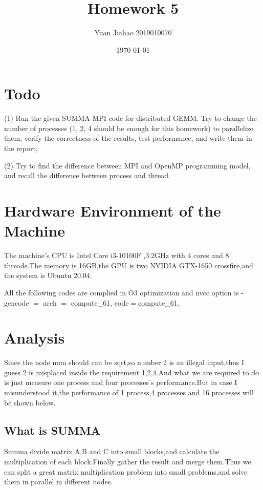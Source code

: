 \documentclass[12pt]{scrartcl} %
\title{	
	Homework 5
}
\author{Yuan Jiahao 2019010070} %
\date{\normalsize\today} %
\begin{document}
\maketitle %


\section{Todo}
 (1) Run the given SUMMA MPI code for distributed GEMM. Try to change the number of
processes (1, 2, 4 should be enough for this homework) to parallelize them, verify the correctness
of the results, test performance, and write them in the report;

(2) Try to find the difference between MPI and OpenMP programming model, and recall
the difference between process and thread.
\section{Hardware Environment of the Machine }
The machine's CPU is Intel Core i3-10100F ,3.2GHz with 4 cores and 8 threads.The memory is 16GB,the GPU is two NVIDIA GTX-1650 crossfire,and the system is Ubuntu 20.04.

All the following codes are complied in O3 optimization and nvcc option is -gencode $=$ arch $=$ compute\_61, code$=$compute\_61.
\section{Analysis}
Since the node num should can be sqrt,so number 2 is an illegal input,thus I guess 2 is misplaced inside the requirement 1,2,4.And what we are required to do is just measure one process and four processes's performance.But in case I misunderstood it,the performance of 1 process,4 processes and 16 processes will be shown below.

\subsection{What is SUMMA}
Summa divide matrix A,B and C into small blocks,and calculate the multiplication of each block.Finally gather the result and merge them.Thus we can split a great matrix multiplication problem into small problems,and solve them in parallel in different nodes.
\end{document}
